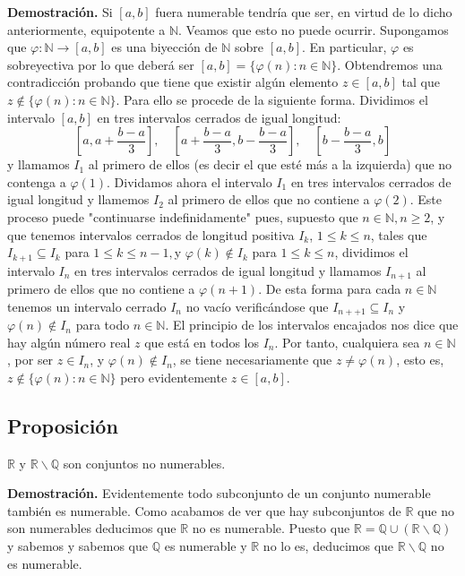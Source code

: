 \documentclass[10pt,a4paper]{article}
\begin{document}
	\textbf{Demostración. }Si $[a, b]$ fuera numerable tendría que ser, en virtud de lo dicho anteriormente, equipotente a $\mathbb{N}$. Veamos que esto no puede ocurrir. Supongamos que $\varphi:\mathbb{N} \rightarrow [a, b]$ es una biyección de $\mathbb{N}$ sobre $[a, b]$. En particular, $\varphi$ es sobreyectiva por lo que deberá ser $[a, b] = \{\varphi(n) : n \in \mathbb{N}\}$. Obtendremos una contradicción probando que tiene que existir algún elemento $z \in [a, b]$ tal que $z \notin \{\varphi(n): n \in \mathbb{N}\}$. Para ello se procede de la siguiente forma. Dividimos el intervalo $[a, b]$ en tres intervalos cerrados de igual longitud:
	$$\left[a, a + \dfrac{b-a}{3}\right], \quad \left[a + \dfrac{b-a}{3}, b - \dfrac{b-a}{3}\right], \quad \left[b - \dfrac{b-a}{3}, b\right]$$
	y llamamos $I_1$ al primero de ellos (es decir el que esté más a la izquierda) que no contenga a $\varphi(1)$. Dividamos ahora el intervalo $I_1$ en tres intervalos cerrados de igual longitud y llamemos $I_2$ al primero de ellos que no contiene a $\varphi(2)$. Este proceso puede "continuarse indefinidamente" pues, supuesto que $n \in \mathbb{N}, n \geq 2$, y que tenemos intervalos cerrados de longitud positiva $I_k$, $1 \leq k \leq n$, tales que $I_{k+1} \subseteq I_k$ para $1 \leq k \leq n-1, $y $\varphi(k) \notin I_k $ para $1 \leq k \leq n$, dividimos el intervalo $I_n$ en tres intervalos cerrados de igual longitud y llamamos $I_{n+1}$ al primero de ellos que no contiene a $\varphi(n+1)$. De esta forma para cada $n \in \mathbb{N}$ tenemos un intervalo cerrado $I_n$ no vacío verificándose que $I_{n++1} \subseteq I_n$ y $ \varphi(n) \notin I_n$ para todo $n \in \mathbb{N}$. El principio de los intervalos encajados nos dice que hay algún número real $z$ que está en todos los $I_n$. Por tanto, cualquiera sea $n \in \mathbb{N}$, por ser $z \in I_n$, y $\varphi(n) \notin I_n$, se tiene necesariamente que $z \neq \varphi(n)$, esto es, $z \notin \{\varphi(n) : n \in \mathbb{N}\}$ pero evidentemente $z \in [a, b]$.
	
	\subsection{Proposición}
	
	$\mathbb{R}$ y $\mathbb{R} \backslash \mathbb{Q}$ son conjuntos no numerables.
	
	\textbf{Demostración. }Evidentemente todo subconjunto de un conjunto numerable también es numerable. Como acabamos de ver que hay subconjuntos de $\mathbb{R}$ que no son numerables deducimos que $\mathbb{R}$ no es numerable. Puesto que $\mathbb{R} = \mathbb{Q} \cup (\mathbb{R} \backslash\mathbb{Q})$ y sabemos y sabemos que $\mathbb{Q}$ es numerable y $\mathbb{R}$ no lo es, deducimos que $\mathbb{R} \backslash \mathbb{Q}$ no es numerable.
	
\end{document}
